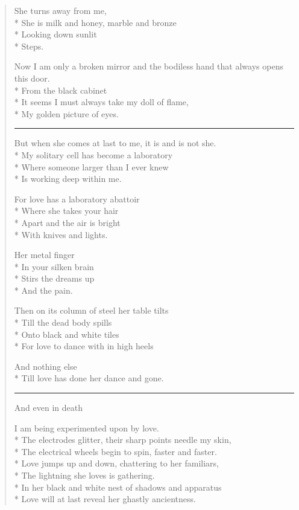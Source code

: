 \documentclass[english,11pt,letterpaper,onecolumn]{scrbook}
\begin{document}
\begin{verse}
She turns away from me, \\*
She is milk and honey, marble and bronze \\*
Looking down sunlit \\*
Steps.



Now I am only a broken mirror and the bodiless hand that always opens this door. \\*
From the black cabinet  \\*
It seems I must always take my doll of flame, \\*
My golden picture of eyes.


\begin{center}\rule[3pt]{2in}{0.5pt}\end{center}


But when she comes at last to me, it is and is not she. \\*
My solitary cell has become a laboratory \\*
Where someone larger than I ever knew  \\*
Is working deep within me.



For love has a laboratory abattoir \\*
Where she takes your hair \\*
Apart and the air is bright \\*
With knives and lights.



Her metal finger  \\*
In your silken brain \\*
Stirs the dreams up  \\*
And the pain.



Then on its column of steel her table tilts \\*
Till the dead body spills  \\*
Onto black and white tiles \\*
For love to dance with in high heels 



And nothing else \\*
Till love has done her dance and gone.


\begin{center}\rule[3pt]{2in}{0.5pt}\end{center}


And even in death 



I am being experimented upon by love. \\*
The electrodes glitter, their sharp points needle my skin, \\*
The electrical wheels begin to spin, faster and faster. \\*
Love jumps up and down, chattering to her familiars, \\*
The lightning she loves is gathering. \\*
In her black and white nest of shadows and apparatus \\*
Love will at last reveal her ghastly ancientness.




\end{verse}
\end{document}
